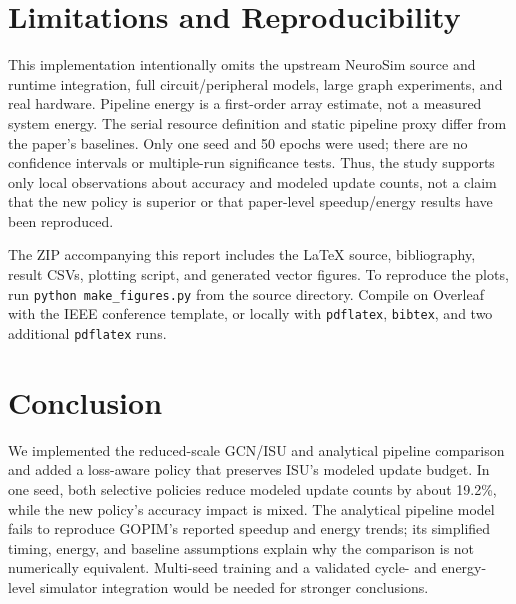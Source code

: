 \documentclass[conference]{IEEEtran}
\begin{document}
\section{Limitations and Reproducibility}
This implementation intentionally omits the upstream NeuroSim source and
runtime integration, full circuit/peripheral models, large graph experiments,
and real hardware. Pipeline energy is a first-order array estimate, not a
measured system energy. The serial resource definition and static pipeline
proxy differ from the paper's baselines. Only one seed and 50 epochs were
used; there are no confidence intervals or multiple-run significance tests.
Thus, the study supports only local observations about accuracy and modeled
update counts, not a claim that the new policy is superior or that paper-level
speedup/energy results have been reproduced.

The ZIP accompanying this report includes the LaTeX source, bibliography,
result CSVs, plotting script, and generated vector figures. To reproduce the
plots, run \texttt{python make\_figures.py} from the source directory. Compile
on Overleaf with the IEEE conference template, or locally with
\texttt{pdflatex}, \texttt{bibtex}, and two additional \texttt{pdflatex} runs.

\section{Conclusion}
We implemented the reduced-scale GCN/ISU and analytical pipeline comparison
and added a loss-aware policy that preserves ISU's modeled update budget. In
one seed, both selective policies reduce modeled update counts by about
19.2\%, while the new policy's accuracy impact is mixed. The analytical
pipeline model fails to reproduce GOPIM's reported speedup and energy trends;
its simplified timing, energy, and baseline assumptions explain why the
comparison is not numerically equivalent. Multi-seed training and a
validated cycle- and energy-level simulator integration would be needed for
stronger conclusions.

\balance


\end{document}
